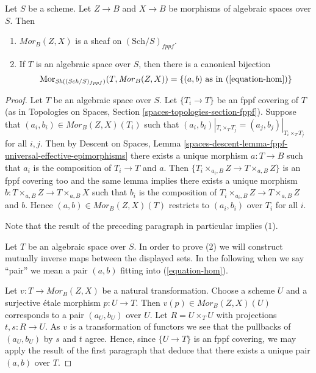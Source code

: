 \begin{lemma}
\label{lemma-hom-functor-sheaf}
Let $S$ be a scheme. Let $Z \to B$ and $X \to B$ be morphisms of
algebraic spaces over $S$. Then
\begin{enumerate}
\item $\mathit{Mor}_B(Z, X)$ is a sheaf on
$(\text{Sch}/S)_{fppf}$.
\item If $T$ is an algebraic space over $S$, then there is a
canonical bijection
$$
\text{Mor}_{\textit{Sh}((\textit{Sch}/S)_{fppf})}(T, \mathit{Mor}_B(Z, X))
=
\{(a, b)\text{ as in }(\ref{equation-hom})\}
$$
\end{enumerate}
\end{lemma}

\begin{proof}
Let $T$ be an algebraic space over $S$. Let $\{T_i \to T\}$ be an fppf
covering of $T$ (as in
Topologies on Spaces, Section \ref{spaces-topologies-section-fppf}).
Suppose that $(a_i, b_i) \in \mathit{Mor}_B(Z, X)(T_i)$ such
that $(a_i, b_i)|_{T_i \times_T T_j} = (a_j, b_j)|_{T_i \times_T T_j}$
for all $i, j$. Then by
Descent on Spaces,
Lemma \ref{spaces-descent-lemma-fppf-universal-effective-epimorphisms}
there exists a unique morphism $a : T \to B$ such that $a_i$ is the
composition of $T_i \to T$ and $a$. Then
$\{T_i \times_{a_i, B} Z \to T \times_{a, B} Z\}$ is an fppf covering
too and the same lemma implies there exists a unique morphism
$b : T \times_{a, B} Z \to T \times_{a, B} X$ such that $b_i$ is the
composition of $T_i \times_{a_i, B} Z \to T \times_{a, B} Z$ and $b$. Hence
$(a, b) \in \mathit{Mor}_B(Z, X)(T)$ restricts to $(a_i, b_i)$
over $T_i$ for all $i$.

\medskip\noindent
Note that the result of the preceding paragraph in particular implies (1).

\medskip\noindent
Let $T$ be an algebraic space over $S$. In order to prove (2) we will
construct mutually inverse maps between the displayed sets. In the
following when we say ``pair'' we mean a pair $(a, b)$ fitting
into (\ref{equation-hom}).

\medskip\noindent
Let $v : T \to \mathit{Mor}_B(Z, X)$ be a natural transformation.
Choose a scheme $U$ and a surjective \'etale morphism $p : U \to T$.
Then $v(p) \in \mathit{Mor}_B(Z, X)(U)$ corresponds to a pair $(a_U, b_U)$
over $U$. Let $R = U \times_T U$ with projections $t, s : R \to U$.
As $v$ is a transformation of functors we see that the pullbacks of
$(a_U, b_U)$ by $s$ and $t$ agree. Hence, since $\{U \to T\}$ is an
fppf covering, we may apply the result of the first paragraph that
deduce that there exists a unique pair $(a, b)$ over $T$.


\end{proof}
